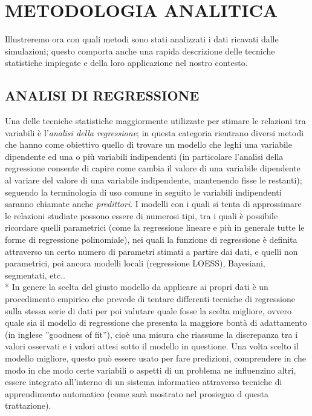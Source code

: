 \documentclass[12pt,a4paper,openright,twoside]{report}
\begin{document}
\section{METODOLOGIA ANALITICA}

Illustreremo ora con quali metodi sono stati analizzati i dati ricavati dalle simulazioni; questo comporta anche una rapida descrizione delle tecniche statistiche impiegate e della loro applicazione nel nostro contesto.

\subsection{ANALISI DI REGRESSIONE}
Una delle tecniche statistiche maggiormente utilizzate per stimare le relazioni tra variabili è l'\emph{analisi della regressione}; in questa categoria rientrano diversi metodi che hanno come obiettivo quello di trovare un modello che leghi una variabile dipendente ed una o più variabili indipendenti (in particolare l'analisi della regressione consente di capire come cambia il valore di una variabile dipendente al variare del valore di una variabile indipendente, mantenendo fisse le restanti); seguendo la terminologia di uso comune in seguito le variabili indipendenti saranno chiamate anche \emph{predittori}.  
I modelli con i quali si tenta di approssimare le relazioni studiate possono essere di numerosi tipi, tra i quali è possibile ricordare quelli parametrici (come la regressione lineare e più in generale tutte le forme di regressione polinomiale), nei quali la funzione di regressione è definita attraverso un certo numero di parametri stimati a partire dai dati, e quelli non parametrici, poi ancora modelli locali (regressione LOESS), Bayesiani, segmentati, etc..\\*
In genere la scelta del giusto modello da applicare ai propri dati è un procedimento empirico che prevede di tentare differenti tecniche di regressione sulla stessa serie di dati per poi valutare quale fosse la scelta migliore, ovvero quale sia il modello di regressione che presenta la maggiore bontà di adattamento (in inglese ''goodness of fit''), cioè una misura che riassume la discrepanza tra i valori osservati e i valori attesi sotto il modello in questione. 
Una volta scelto il modello migliore, questo può essere usato per fare predizioni, comprendere in che modo in che modo certe variabili o aspetti di un problema ne influenzino altri, essere integrato all'interno di un sistema informatico attraverso tecniche di apprendimento automatico (come sarà mostrato nel prosieguo d questa trattazione). 
\end{document}
